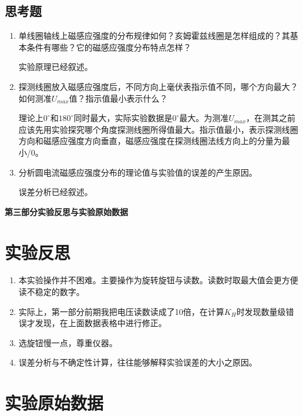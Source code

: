 \documentclass[11pt]{article}
\begin{document}
\subsection{思考题}
\begin{enumerate}
    \item 单线圈轴线上磁感应强度的分布规律如何？亥姆霍兹线圈是怎样组成的？其基本条件有哪些？它的磁感应强度分布特点怎样？
    \par \hspace*{2em}实验原理已经叙述。
    \item 探测线圈放入磁感应强度后，不同方向上毫伏表指示值不同，哪个方向最大？如何测准$U_{max}$值？指示值最小表示什么？
    \par \hspace*{2em}理论上$0^\circ$和$180^\circ$同时最大，实际实验数据是$0^\circ$最大。为测准$U_{max}$，在测其之前应该先用实验探究哪个角度探测线圈所得值最大。指示值最小，表示探测线圈方向和磁感应强度方向垂直，磁感应强度在探测线圈法线方向上的分量为最小/0。
    \item 分析圆电流磁感应强度分布的理论值与实验值的误差的产生原因。
    \par \hspace*{2em}误差分析已经叙述。
\end{enumerate}
\begin{center}
    \vspace*{1em}
    \Large \bf 第三部分\qquad 实验反思与实验原始数据
\end{center}
\setcounter{section}{0}
\section{实验反思}
\begin{enumerate}
    \item 本实验操作并不困难。主要操作为旋转旋钮与读数。读数时取最大值会更方便读不稳定的数字。
    \item 实际上，第一部分前期我把电压读数读成了10倍，在计算$K_H$时发现数量级错误才发现，在上面数据表格中进行修正。
    \item 选旋钮慢一点，尊重仪器。
    \item 误差分析与不确定性计算，往往能够解释实验误差的大小之原因。
\end{enumerate}
\section{实验原始数据}

\end{document}
